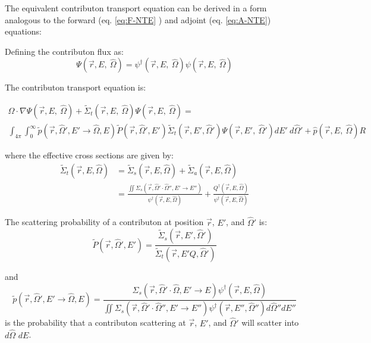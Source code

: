 The equivalent contributon transport equation can be derived in a form analogous
to the forward (eq. \ref{eq:F-NTE} ) and adjoint (eq. \ref{eq:A-NTE}) equations:

Defining the contributon flux as:
\begin{equation}
\Psi (\vec {r} ,E,\:\hat\Omega) = \psi^{\dagger} (\vec {r} ,E,\:\hat\Omega)
        \psi(\vec {r} ,E,\:\hat\Omega)
\label{eq.Cont-Flux}
\end{equation}


The contributon transport equation is:

\begin{multline}
\hat\Omega \cdot \nabla \Psi (\vec {r} ,E,\:\hat\Omega)
+\widetilde{\Sigma} _{ t }(\vec{r},E,\:\hat\Omega)\Psi (\vec { r } ,E,\:\hat\Omega)
     = \\
        \int _{ 4\pi  } \int _{ 0 }^{ \infty  }
        \widetilde{p}(\vec{r}, \hat\Omega', E'\rightarrow\hat\Omega, E)
        \widetilde{P}(\vec{r}, \hat\Omega',E')
        \widetilde{\Sigma} _{ t }(\vec{r}, E', \hat\Omega')
        \Psi (\vec { r } ,E',\: \hat\Omega')dE' \:d\hat\Omega'
        + \hat p(\vec { r } ,E, \:\hat\Omega) R
\label{eq:Cont-NTE}
\end{multline}

where the effective cross sections are given by:
\begin{equation}
\begin{aligned}
\widetilde{\Sigma}_{t}(\vec{r}, E, \hat\Omega) &=
        \widetilde{\Sigma}_{s}(\vec{r}, E, \hat\Omega) +
        \widetilde{\Sigma}_{a}(\vec{r}, E, \hat\Omega)    \\
     &= \frac{\iint \Sigma_{s}(\vec{r},\hat\Omega'\cdot\hat\Omega'',
        E'\rightarrow E'')}{\psi^{\dagger}(\vec{r}, E, \hat\Omega)}
        + \frac{Q^{\dagger}(\vec{r}, E, \hat\Omega)}
        {\psi^{\dagger}(\vec{r}, E, \hat\Omega)}
\end{aligned}
\end{equation}

The scattering probability of a contributon at position $\vec{r}$, $E'$, and
$\hat\Omega'$ is:
\begin{equation}
\widetilde{P}(\vec{r}, \hat\Omega',E') =
         \frac{\widetilde{\Sigma} _{ s }(\vec{r}, E', \hat\Omega')}
       {\widetilde{\Sigma} _{ t }(\vec{r}, E'Q, \hat\Omega')}
\end{equation}

and
\begin{equation}
\widetilde{p}(\vec{r}, \hat\Omega', E'\rightarrow\hat\Omega, E) =
       \frac{\Sigma_{s}(\vec{r},\hat\Omega'\cdot\hat\Omega,E'\rightarrow E)
       \psi^{\dagger} (\vec{r}, E, \hat\Omega)}
       {\iint \Sigma_{s}(\vec{r},\hat\Omega'\cdot\hat\Omega'',E'\rightarrow
       E'')\psi^{\dagger} (\vec{r}, E'', \hat\Omega'')d\hat\Omega'' dE''}
\end{equation}
is the probability that a contributon scattering at $\vec{r}$, $E'$, and $\hat\Omega'$ will scatter into $d\hat\Omega$ $dE$.

